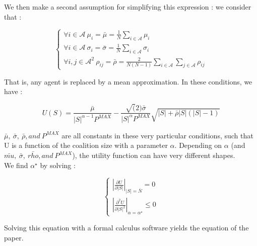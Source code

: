 \documentclass[journal]{IEEEtran}
\begin{document}
We then make a second assumption for simplifying this expression : we consider that :

\[ \left\{ \begin{array}{lll} \forall i \in \mathcal{A}\ \mu_i = \bar{ \mu } = \frac{1}{N} \sum_{i \in \mathcal{A}} \mu_i  \\ \forall i \in \mathcal{A}\ \sigma_i = \bar{ \sigma } = \frac{1}{N} \sum_{i \in \mathcal{A}} \sigma_i \\ \forall i,j \in \mathcal{A}^2\  \rho_{ij} = \bar{ \rho } = \frac{2}{N(N-1)} \sum_{i \in \mathcal{A}} \sum_{j \in \mathcal{A}} \rho_{ij} \end{array} \right.\]

That is, any agent is replaced by a mean approximation. In these conditions, we have :

\[ U(S) = \frac{ \bar{ \mu } }{ |S|^{\alpha -1} P^{MAX} } - \frac{ \sqrt(2) \bar{ \sigma } }{ |S|^{\alpha} P^{MAX} } \sqrt{|S| + \bar{ \rho } |S| ( |S| - 1 ) } \]

$ \bar{ \mu },\ \bar{ \sigma },\ \bar{ \rho }, and\ P^{MAX} $ are all constants in these very particular conditions, such that U is a function of the coalition size with a parameter $ \alpha $. Depending on $ \alpha $ (and $ \bar{ mu },\ \bar{ \sigma },\ \bar{ rho }, and\ P^{MAX} $), the utility function can have very different shapes.
\\
We find $\alpha^{\star} $ by solving :

\[ \left\{ \begin{array}{lll} \left| \frac{ \partial U }{ \partial |S| } \right|_{|S|=\bar{N}} = 0 \\ \left| \frac{ \partial^2 U }{ \partial |S|^2 } \right|_{\alpha = \alpha^{\star}} \leq 0 \end{array} \right. \]  

Solving this equation with a formal calculus software yields the equation of the paper.

  

\end{document}

